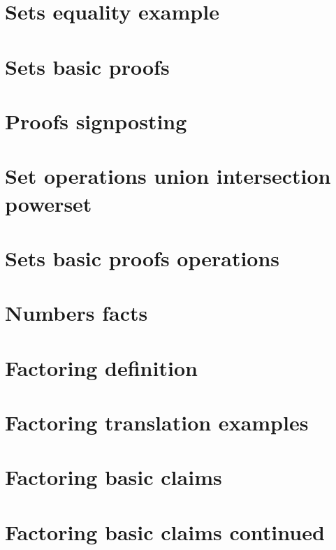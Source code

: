 \section*{Sets equality example}

\vfill
\section*{Sets basic proofs}

\vfill
\section*{Proofs signposting}

\vfill
\section*{Set operations union intersection powerset}

\vfill
\section*{Sets basic proofs operations}

\vfill
\section*{Numbers facts}

\vfill
\section*{Factoring definition}

\vfill
\section*{Factoring translation examples}

\vfill
\section*{Factoring basic claims}

\vfill
\section*{Factoring basic claims continued}

\vfill
